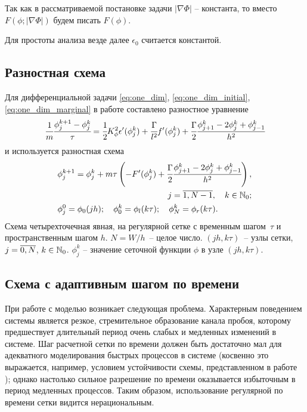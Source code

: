 Так как в рассматриваемой постановке задачи $|\nabla \Phi|$ -- константа, то вместо $F(\phi; |\nabla \Phi|)$ будем писать $F(\phi)$.

Для простоты анализа везде далее $\epsilon_0$ считается константой.


\subsection{Разностная схема}

Для дифференциальной задачи \eqref{eq:one_dim}, \eqref{eq:one_dim_initial}, \eqref{eq:one_dim_marginal} в работе \cite{ponomarev_stability} составлено разностное уравнение
\begin{equation}
	\cfrac{1}{m} \cfrac{{\phi}_j^{k + 1} - {\phi}_j^k}{\tau} = \cfrac{1}{2} K_\phi^2 \epsilon'(\phi_j^k) + \cfrac{\Gamma}{l^2} f'(\phi_j^k) + \cfrac{\Gamma}{2} \cfrac{{\phi}_{j + 1}^k - 2 {\phi}_j^k + {\phi}_{j - 1}^k}{h^2}
	\label{eq:subtractive}
\end{equation}
и используется разностная схема
\begin{align}
	& \begin{aligned}
		\phi_j^{k + 1} = \phi_j^k + m \tau \left( -F'(\phi_j^k) + \cfrac{\Gamma}{2} \cfrac{{\phi}_{j + 1}^k - 2 {\phi}_j^k + {\phi}_{j - 1}^k}{h^2} \right), & \\
		j = \overline{1, N - 1}, \quad k \in {\mathbb{N}}_0; &
	\end{aligned}
	\label{sch:transition_old} \\
	& \phi_j^0 = \phi_0(jh); \quad \phi_0^k = \phi_l(k \tau); \quad \phi_N^k = \phi_r(k \tau).
	\label{sch:borders}
\end{align}
Схема четырехточечная явная, на регулярной сетке с временным шагом~$\tau$ и пространственным шагом $h$. $N = W / h$~-- целое число. $(jh, k \tau)$~-- узлы сетки, $j \hm = \overline{0, N}$, $k \in {\mathbb{N}}_0$. $\phi_j^k$ -- значение сеточной функции $\phi$ в узле $(jh, k \tau)$.


\subsection{Схема с адаптивным шагом по времени}

При работе с моделью возникает следующая проблема. Характерным поведением системы является резкое, стремительное образование канала пробоя, которому предшествует длительный период очень слабых и медленных изменений в системе. Шаг расчетной сетки по времени должен быть достаточно мал для адекватного моделирования быстрых процессов в системе (косвенно это выражается, например, условием устойчивости схемы, представленном в работе \cite{ponomarev_stability}); однако настолько сильное разрешение по времени оказывается избыточным в период медленных процессов. Таким образом, использование регулярной по времени сетки видится нерациональным.

